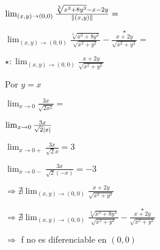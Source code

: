 \documentclass[../parcial.tex]{subfiles}
\begin{document}
    $\lim_{(x,y)\to (0,0)} \frac{\sqrt[3]{x^3+8y^3} -x - 2y}{\norm*{(x,y)}} = $

    $\lim_{(x,y)\to (0,0)} \frac{\sqrt[3]{x^3+8y^3}}{\sqrt{x^2+y^2}} - \stackrel{\star}{\frac{x+2y}{\sqrt{x^2+y^2}}} = $

    $\star: \lim_{(x,y) \to (0,0)} \frac{x+2y}{\sqrt{x^2+y^2}} $

    Por $y = x$

    $\lim_{x \to 0} \frac{3x}{\sqrt{2x^2}} = $

    $\lim_{x \to 0} \frac{3x}{\sqrt{2} \abs*{x}} $

    $\lim_{x \to 0+} \frac{3x}{\sqrt{2} x} = 3 $

    $\lim_{x \to 0-} \frac{3x}{\sqrt{2}(-x)} = -3 $

    $ \Rightarrow \nexists \lim_{(x,y) \to (0,0)} \frac{x+2y}{\sqrt{x^2+y^2}}$

    $ \Rightarrow \nexists \lim_{(x,y)\to (0,0)} \frac{\sqrt[3]{x^3+8y^3}}{\sqrt{x^2+y^2}} - \stackrel{\star}{\frac{x+2y}{\sqrt{x^2+y^2}}}$

    $ \Rightarrow $ f no es diferenciable en $(0,0)$
\end{document}
